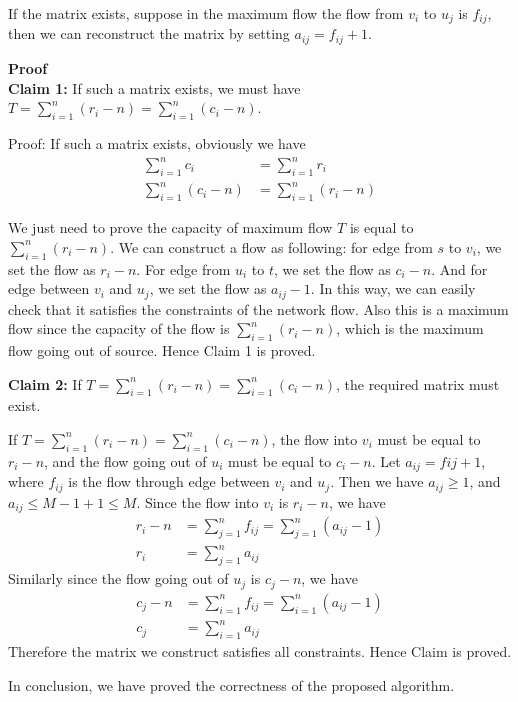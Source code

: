 \documentclass{article}
\newcommand{\Proof}{\vspace{0.3cm} \noindent\textbf{Proof} \\}
\begin{document}
If the matrix exists, suppose in the maximum flow the flow from $v_i$ to $u_j$ is $f_{ij}$, then we can reconstruct the
matrix by setting $a_{ij} = f_{ij} + 1$.


\Proof
\textbf{Claim 1:} If such a matrix exists, we must have $ T = \sum_{i=1}^{n} (r_i - n) =
\sum_{i=1}^{n}(c_i - n)$.

Proof: If such a matrix exists, obviously we have 
\begin{align}
  \sum_{i=1}^{n}c_i &= \sum_{i=1}^{n}r_i \\
  \sum_{i=1}^{n}(c_i -n) &= \sum_{i=1}^{n}(r_i - n)  
\end{align}

We just need to prove the capacity of maximum flow $T$ is equal to $ \sum_{i=1}^{n}(r_i -n)$.
We can construct a flow as following: for edge from $s$ to $v_i$, we set the flow as $r_i - n$.     
For edge from $u_i$ to $t$, we set the flow as $c_i - n$. And for edge between $v_i$ and $u_j$, we
set the flow as $a_{ij} - 1$. In this way, we can easily check that it satisfies the constraints of
the network flow. Also this is a maximum flow since the capacity of the flow is $\sum_{i=1}^{n}(r_i
- n)$, which is the maximum flow going out of source. Hence Claim 1 is proved.

\textbf{Claim 2:} If $T = \sum_{i=1}^{n} (r_i - n) = \sum_{i=1}^{n}(c_i - n)$, the required
matrix must exist.

If $T = \sum_{i=1}^{n} (r_i - n) = \sum_{i=1}^{n}(c_i -n)$, the flow into $v_i$ must be equal to
$r_i - n$, and the flow going out of $u_i$ must be equal to $c_i - n$. 
Let $a_{ij} = f{ij} + 1$, where $f_{ij}$ is the flow through edge between $v_i$ and $u_j$. Then we
have $a_{ij} \geq 1$, and $a_{ij} \leq M-1 + 1 \leq M$. Since the flow into $v_i$ is $r_i - n$, we
have
\begin{align}
  r_i - n &= \sum_{j=1}^{n}f_{ij} = \sum_{j=1}^{n}(a_{ij} - 1) \\
  r_i &= \sum_{j=1}^{n}a_{ij} 
\end{align}
Similarly since the flow going out of $u_j$ is $c_j - n$, we have 
\begin{align}
  c_j - n &= \sum_{i=1}^{n}f_{ij} = \sum_{i=1}^{n}(a_{ij} - 1) \\
  c_j &= \sum_{i=1}^{n}a_{ij} 
\end{align}
Therefore the matrix we construct satisfies all constraints. Hence Claim is proved.

In conclusion, we have proved the correctness of the proposed algorithm.
\end{document}
